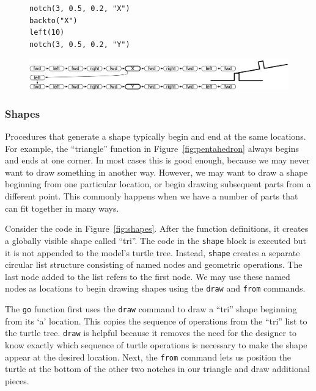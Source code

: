 \documentclass[times, 10pt,twocolumn]{article}
\makeatletter
\newenvironment{subfloat}%
{\def\caption##1{\gdef\subcapsave{\relax##1}}%
\let\subcapsave=\@empty %
\let\sf@oldlabel=\label 
\def\label##1{\xdef\sublabsave{\noexpand\label{##1}}}%
\let\sublabsave\relax %
\setbox\subfigbox\hbox 
\bgroup}%
{\egroup %
\let\label=\sf@oldlabel 
\subfigure[\subcapsave]{\box\subfigbox}}%
\makeatother
\begin{document}
\begin{figure}
  \begin{subfloat}
    \begin{minipage}{1.6in}
      \small
\begin{verbatim}
notch(3, 0.5, 0.2, "X")
backto("X")
left(10)
notch(3, 0.5, 0.2, "Y")
\end{verbatim}
    \end{minipage}
  \end{subfloat}
  \begin{subfloat}
    \begin{minipage}{5.0in}
      \includegraphics[width=5.0in]{turtle_tree_graph.pdf}
      \end{minipage}
  \end{subfloat}
  \caption{Code, associated Turtle Tree, and graphic output.}
  \label{fig:turtle-tree}
\end{figure}
  


\subsubsection{Shapes}

Procedures that generate a shape typically begin and end at the same
locations. For example, the ``triangle'' function in
Figure~\ref{fig:pentahedron} always begins and ends at one corner. In
most cases this is good enough, because we may never want to draw
something in another way. However, we may want to draw a shape
beginning from one particular location, or begin drawing subsequent
parts from a different point. This commonly happens when we have a
number of parts that can fit together in many ways.

Consider the code in Figure~\ref{fig:shapes}. After the function
definitions, it creates a globally visible shape called ``tri''. The
code in the \textnhtt{shape} block is executed but it is not appended
to the model's turtle tree. Instead, \textnhtt{shape} creates a
separate circular list structure consisting of named nodes and
geometric operations. The last node added to the list refers to the
first node. We may use these named nodes as locations to begin drawing
shapes using the \textnhtt{draw} and \textnhtt{from} commands.

The \textnhtt{go} function first uses the \textnhtt{draw} command to
draw a ``tri'' shape beginning from its `a' location. This copies the
sequence of operations from the ``tri'' list to the turtle
tree. \textnhtt{draw} is helpful because it removes the need for the
designer to know exactly which sequence of turtle operations is
necessary to make the shape appear at the desired location. Next, the
\textnhtt{from} command lets us position the turtle at the bottom of
the other two notches in our triangle and draw additional pieces.
\end{document}
